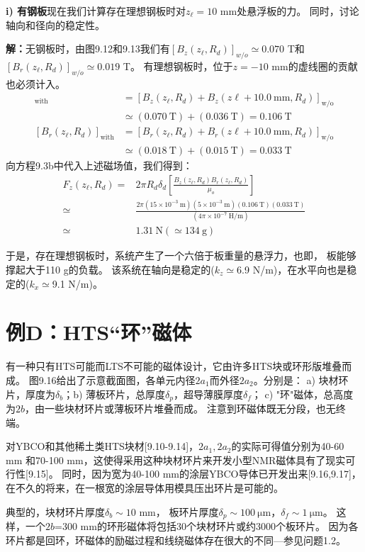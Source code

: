 \textbf{i) 有钢板}\qquad 现在我们计算存在理想钢板时对$z_\ell=10$ mm处悬浮板的力。
同时，讨论轴向和径向的稳定性。

\textbf{解：}无钢板时，由图9.12和9.13我们有$[B_z(z_\ell,R_d)]_{w/o}\simeq 0.070$ T和
$[B_r(z_\ell,R_d)]_{w/o}\simeq 0.019$ T。
有理想钢板时，位于$z=-10$ mm的虚线圈的贡献也必须计入。
\begin{align*}%
[B_z(z_\ell,R_d)]_{\mathrm{with}}&=[B_z(z_\ell,R_d)+B_z(z\ell+10.0\ \mathrm{mm},R_d)]_{\mathrm{w/o}} \\
&\simeq(0.070\ \mathrm{T})+(0.036\ \mathrm{T})=0.106\ \mathrm{T}\\
[B_r(z_\ell,R_d)]_{\mathrm{with}}&=[B_r(z_\ell,R_d)+B_r(z\ell+10.0\ \mathrm{mm},R_d)]_{\mathrm{w/o}} \\
&\simeq(0.018\ \mathrm{T})+(0.015\ \mathrm{T})=0.033\ \mathrm{T}
\end{align*}
向方程9.3b中代入上述磁场值，我们得到：
\begin{align*}%
F_z(z_\ell,R_d)=&2\pi R_d\delta_d\left[\frac{B_z(z_\ell,R_d)B_r(z_\ell,R_d)}{\mu_o}\right]  \\\tag{9.3b}
\simeq&\frac{2\pi(15\times 10^{-3}\ \mathrm{m})(5\times 10^{-3}\ \mathrm{m})(0.106\ \mathrm{T})(0.033\ \mathrm{T})}{(4\pi\times 10^{-7}\ \mathrm{H/m})} \\
\simeq& 1.31\ \mathrm{N}(\simeq 134\ \mathrm{g})
\end{align*}

于是，存在理想钢板时，系统产生了一个六倍于板重量的悬浮力，也即，
板能够撑起大于110 g的负载。
该系统在轴向是稳定的($k_z\simeq$6.9 N/m)，在水平向也是稳定的($k_x\simeq$9.1 N/m)。


\section{例D：HTS“环”磁体}
有一种只有HTS可能而LTS不可能的磁体设计，它由许多HTS块或环形版堆叠而成。
图9.16给出了示意截面图，各单元内径$2a_1$而外径$2a_2$。分别是：
a) 块材环片，厚度为$\delta_b$；b) 薄板环片，总厚度$\delta_p$，超导薄膜厚度$\delta_f$；
c) "环"磁体，总高度为$2b$，由一些块材环片或薄板环片堆叠而成。
注意到环磁体既无分段，也无终端。

对YBCO和其他稀土类HTS块材[9.10-9.14]，$2a_1,2a_2$的实际可得值分别为40-60 mm
和70-100 mm，这使得采用这种块材环片来开发小型NMR磁体具有了现实可行性[9.15]。
同时，因为宽为40-100 mm的涂层YBCO导体已开发出来[9.16,9.17]，
在不久的将来，在一根宽的涂层导体用模具压出环片是可能的。

典型的，块材环片厚度$\delta_b\sim 10$ mm，
板环片厚度$\delta_p\sim 100\ \mathrm{\mu m}$，$\delta_f\sim 1\ \mathrm{\mu m}$。
这样，一个$2b$=300 mm的环形磁体将包括30个块材环片或约3000个板环片。
因为各环片都是回环，环磁体的励磁过程和线绕磁体存在很大的不同---参见问题1.2。

